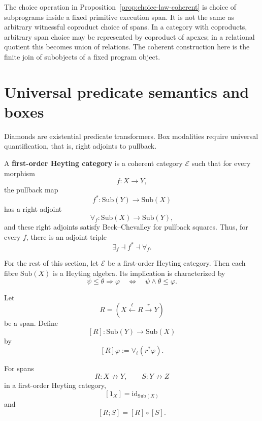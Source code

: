 \begin{remark}
\label{rem:subprogram-choice-versus-span-coproduct}
The choice operation in Proposition~\ref{prop:choice-law-coherent} is choice of subprograms inside a fixed primitive execution span. It is not the same as arbitrary witnessful coproduct choice of spans. In a category with coproducts, arbitrary span choice may be represented by coproduct of apexes; in a relational quotient this becomes union of relations. The coherent construction here is the finite join of subobjects of a fixed program object.
\end{remark}

\section{Universal predicate semantics and boxes}
\label{sec:universal-predicate-semantics-boxes}

Diamonds are existential predicate transformers. Box modalities require universal quantification, that is, right adjoints to pullback.

\begin{definition}
\label{def:first-order-heyting-category}
A \textbf{first-order Heyting category} is a coherent category \(\mathcal E\) such that for every morphism
\[
f:X\to Y,
\]
the pullback map
\[
f^\ast:\mathrm{Sub}(Y)\to\mathrm{Sub}(X)
\]
has a right adjoint
\[
\forall_f:\mathrm{Sub}(X)\to\mathrm{Sub}(Y),
\]
and these right adjoints satisfy Beck--Chevalley for pullback squares.
Thus, for every \(f\), there is an adjoint triple
\[
\exists_f\dashv f^\ast\dashv \forall_f.
\]
\end{definition}

For the rest of this section, let \(\mathcal E\) be a first-order Heyting category. Then each fibre \(\mathrm{Sub}(X)\) is a Heyting algebra. Its implication is characterized by
\[
\psi\le \theta\Rightarrow\varphi
\quad\Longleftrightarrow\quad
\psi\wedge\theta\le\varphi.
\]

\begin{definition}
\label{def:box-modality-span}
Let
\[
R=
\left(
X\xleftarrow{\ell}R\xrightarrow{r}Y
\right)
\]
be a span. Define
\[
[R]:
\mathrm{Sub}(Y)\to\mathrm{Sub}(X)
\]
by
\[
[R]\varphi
:=
\forall_\ell(r^\ast\varphi).
\]
\end{definition}

\begin{proposition}
\label{prop:box-functoriality}
For spans
\[
R:X\nrightarrow Y,
\qquad
S:Y\nrightarrow Z
\]
in a first-order Heyting category,
\[
[1_X]=\mathrm{id}_{\mathrm{Sub}(X)}
\]
and
\[
[R;S]=[R]\circ[S].
\]
\end{proposition}

